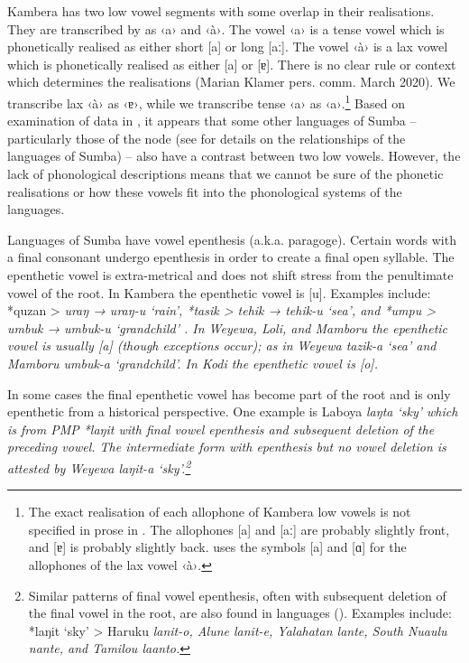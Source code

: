 Kambera has two low vowel segments with some overlap in their realisations.
They are transcribed by \citet{Klamer1998a} as ‹a› and ‹à›.
The vowel ‹a› is a tense vowel which is phonetically realised
as either short [a] or long [aː].
The vowel ‹à› is a lax vowel which is phonetically realised
as either [a] or [ɐ].
There is no clear rule or context which determines the realisations
(Marian Klamer pers. comm. March 2020).
We transcribe lax ‹à› as ‹ɐ›,
while we transcribe tense ‹a› as ‹a›.\footnote{
		The exact realisation of each allophone of Kambera low vowels
		is not specified in prose in \citet{Klamer1998a}.
		The allophones [a] and [aː] are probably slightly front,
		and [ɐ] is probably slightly back.
		\citet[23]{Klamer1998a} uses the symbols [a]
		and [ɑ] for the allophones of the lax vowel ‹à›.}
Based on examination of data in \citet{Onvlee1984},
it appears that some other languages of Sumba -- particularly
those of the  node (see  for
details on the relationships of the languages of Sumba) -- also
have a contrast between two low vowels.
However, the lack of phonological descriptions means that we
cannot be sure of the phonetic realisations or how these vowels
fit into the phonological systems of the languages.

Languages of Sumba have vowel epenthesis (a.k.a. paragoge).
Certain words with a final consonant undergo epenthesis in order
to create a final open syllable.
The epenthetic vowel is extra-metrical
and does not shift stress from the penultimate vowel of the root.
In Kambera the epenthetic vowel is [u].
Examples include: *quzan > \it{uraŋ → uraŋ-u} ‘rain’,
*tasik > \it{tehik → tehik-u} ‘sea’,
and *umpu > \it{umbuk → umbuk-u} ‘grandchild’ \citep[19]{Klamer1998a}.
In Weyewa, Loli, and Mamboru the epenthetic vowel is usually
[a] (though exceptions occur); as in Weyewa \it{tazik-a} ‘sea’
and Mamboru \it{umbuk-a} ‘grandchild’.
In Kodi the epenthetic vowel is [o].

In some cases the final epenthetic vowel has become part of the
root and is only epenthetic from a historical perspective.
One example is Laboya \it{laŋta} ‘sky’ which is from PMP *laŋit
with final vowel epenthesis
and subsequent deletion of the preceding vowel.
The intermediate form with epenthesis
but no vowel deletion
is attested by Weyewa \it{laŋit-a} ‘sky’.\footnote{
		Similar patterns
		of final vowel epenthesis,
		often with subsequent deletion of the final vowel in the root,
		are also found in  languages ().
		Examples include: *laŋit ‘sky’ > Haruku \it{lanit-o},
		Alune \it{lanit-e}, Yalahatan \it{lante},
		South Nuaulu \it{nante}, and Tamilou \it{laanto}.}

